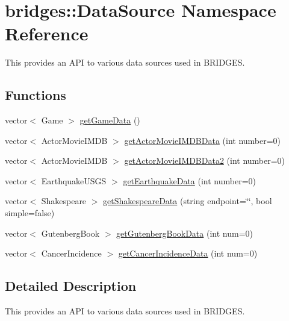 \hypertarget{namespacebridges_1_1_data_source}{}\section{bridges\+:\+:Data\+Source Namespace Reference}
\label{namespacebridges_1_1_data_source}


This provides an A\+PI to various data sources used in B\+R\+I\+D\+G\+ES.  


\subsection*{Functions}
\begin{DoxyCompactItemize}
\item 
vector$<$ Game $>$ \mbox{\hyperlink{namespacebridges_1_1_data_source_a96a28cc7f2a6013fe09b07cc53c7432f}{get\+Game\+Data}} ()
\item 
vector$<$ Actor\+Movie\+I\+M\+DB $>$ \mbox{\hyperlink{namespacebridges_1_1_data_source_ac43ccd8f2a325cf2f057a5ee7f0b73f1}{get\+Actor\+Movie\+I\+M\+D\+B\+Data}} (int number=0)
\item 
vector$<$ Actor\+Movie\+I\+M\+DB $>$ \mbox{\hyperlink{namespacebridges_1_1_data_source_a436c584d3672c9800a3271ad7641ad59}{get\+Actor\+Movie\+I\+M\+D\+B\+Data2}} (int number=0)
\item 
vector$<$ Earthquake\+U\+S\+GS $>$ \mbox{\hyperlink{namespacebridges_1_1_data_source_a2af96553650d859b102f179b3db55389}{get\+Earthquake\+Data}} (int number=0)
\item 
vector$<$ Shakespeare $>$ \mbox{\hyperlink{namespacebridges_1_1_data_source_abdf2e4d709e9b7f1a5370726676d86ec}{get\+Shakespeare\+Data}} (string endpoint=\char`\"{}\char`\"{}, bool simple=false)
\item 
vector$<$ Gutenberg\+Book $>$ \mbox{\hyperlink{namespacebridges_1_1_data_source_a8146b00565286727e8206e377d9ff5bd}{get\+Gutenberg\+Book\+Data}} (int num=0)
\item 
vector$<$ Cancer\+Incidence $>$ \mbox{\hyperlink{namespacebridges_1_1_data_source_a4f8990ea0e793a6464d95cb82f57c8f9}{get\+Cancer\+Incidence\+Data}} (int num=0)
\end{DoxyCompactItemize}


\subsection{Detailed Description}
This provides an A\+PI to various data sources used in B\+R\+I\+D\+G\+ES. 

